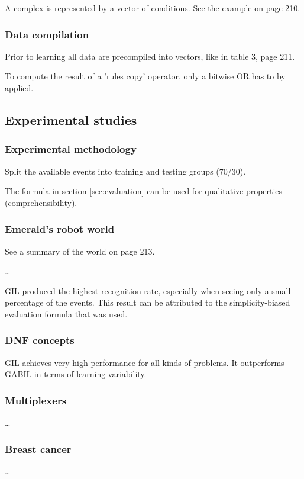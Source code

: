 \documentclass[12pt]{article}
\newcounter{subsubsubsection}[subsubsection]
\begin{document}
A complex is represented by a vector of conditions. See the example on page 210.

\subsubsection{Data compilation}
Prior to learning all data are precompiled into vectors, like in table 3, page 211.

To compute the result of a 'rules copy' operator, only a bitwise OR has to by applied.

\subsection{Experimental studies}
\subsubsection{Experimental methodology}
Split the available events into training and testing groups (70/30).

The formula in section \ref{sec:evaluation} can be used for qualitative properties (comprehensibility).

\subsubsection{Emerald's robot world}
See a summary of the world on page 213.

\dots

GIL produced the highest recognition rate, especially when seeing only a small percentage of the events. This result can be attributed to the simplicity-biased evaluation formula that was used.

\subsubsection{DNF concepts}
GIL achieves very high performance for all kinds of problems. It outperforms GABIL in terms of learning variability.

\subsubsection{Multiplexers}
\dots

\subsubsection{Breast cancer}
\dots
\end{document}
